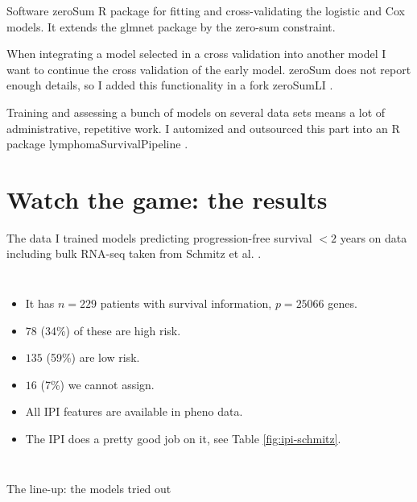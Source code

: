 \documentclass[10pt, aspectratio=169]{beamer}
\begin{document}
\begin{frame}{Software}
  \alert{zeroSum R package} \autocite{zerosumR} for fitting and cross-validating the logistic and Cox models. 
  It extends the glmnet package by the zero-sum constraint.

  When integrating a model selected in a cross validation into another model I want to continue the cross 
  validation of the early model. zeroSum does not report enough details, so I added this functionality in 
  a \alert{fork zeroSumLI} \autocite{zerosumliR}.

  Training and assessing a bunch of models on several data sets means a lot of administrative, repetitive 
  work. I automized and outsourced this part into an \alert{R package lymphomaSurvivalPipeline} \autocite{lspR}.
\end{frame}

\section{Watch the game: the results}

\begin{frame}{The data}
  I trained models predicting progression-free survival $< 2$ years on data including bulk RNA-seq 
  taken from Schmitz et al. \autocite{schmitz18}. 
  \begin{columns}
      \begin{itemize}
        \item It has $n = \num{229}$ patients with survival information, $p = \num{25066}$ genes.
        \item $\num{78}$ (34\%) of these are high risk.
        \item $\num{135}$ (59\%) are low risk. 
        \item $\num{16}$ (7\%) we cannot assign.
        \item All IPI features are available in pheno data.
        \item The IPI does a pretty good job on it, see Table \ref{fig:ipi-schmitz}.
      \end{itemize}
      
    \end{columns}
\end{frame}

\begin{frame}{The line-up: the models tried out}
  
\end{frame}
\end{document}
